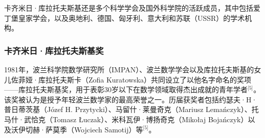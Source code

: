 卡齐米日·库拉托夫斯基还是多个科学学会及国外科学院的活跃成员，其中包括爱丁堡皇家学会，以及奥地利、德国、匈牙利、意大利和苏联（USSR）的学术机构。
\subsubsection{卡齐米日·库拉托夫斯基奖}
1981年，波兰科学院数学研究所（IMPAN）、波兰数学学会以及库拉托夫斯基的女儿佐菲娅·库拉托夫斯卡（Zofia Kuratowska）共同设立了以他名字命名的奖项——库拉托夫斯基奖，用于表彰30岁以下在数学领域取得杰出成就的青年学者\(^\text{[5]}\)。该奖被认为是授予年轻波兰数学家的最高荣誉之一。历届获奖者包括约瑟夫·H·普日蒂茨基（Józef H. Przytycki）、马留什·莱曼奇克（Mariusz Lemańczyk）、托马什·武恰克（Tomasz Łuczak）、米科瓦伊·博扬奇克（Mikołaj Bojańczyk）以及沃伊切赫·萨莫季（Wojciech Samotij）等\(^\text{[5]}\)。
